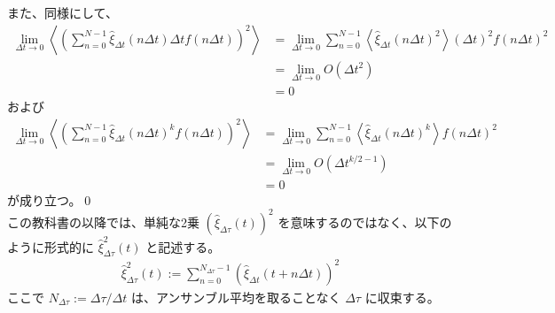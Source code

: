 \documentclass[a4paper,11pt]{jsarticle}
\numberwithin{equation}{section}
\begin{document}
また、同様にして、
\begin{align}
\lim_{\Delta t \to 0} 
\left\langle 
\left( \sum_{n=0}^{N-1} \hat{\xi}_{\Delta t}(n \Delta t) \Delta t f(n \Delta t) \right)^2 
\right\rangle 
&= \lim_{\Delta t \to 0} 
\sum_{n=0}^{N-1} 
\left\langle \hat{\xi}_{\Delta t}(n \Delta t)^2 \right\rangle 
(\Delta t)^2 f(n \Delta t)^2 \\
&= \lim_{\Delta t \to 0} 
O(\Delta t^2)\\
&= 0 
\end{align}
および
\begin{align}
\lim_{\Delta t \to 0}
\left\langle
\left( \sum_{n=0}^{N-1} \hat{\xi}_{\Delta t}(n \Delta t)^k f(n \Delta t) \right)^2
\right\rangle
&= \lim_{\Delta t \to 0}
\sum_{n=0}^{N-1}
\left\langle \hat{\xi}_{\Delta t}(n \Delta t)^k \right\rangle f(n \Delta t)^2 \\
&= \lim_{\Delta t \to 0}
O(\Delta t^{k/2-1})\\
&= 0
\end{align}
が成り立つ。\qed\\

この教科書の以降では、単純な2乗 \((\hat{\xi}_{\Delta \tau}(t))^2\) を意味するのではなく、以下のように形式的に \(\hat{\xi}_{\Delta \tau}^2(t)\) と記述する。
\begin{align}
\hat{\xi}_{\Delta \tau}^2(t) := \sum_{n=0}^{N_{\Delta \tau} - 1} \left( \hat{\xi}_{\Delta t}(t + n\Delta t) \right)^2
\end{align}
ここで \(N_{\Delta \tau} := \Delta \tau / \Delta t\) は、アンサンブル平均を取ることなく \(\Delta \tau\) に収束する。
\end{document}
